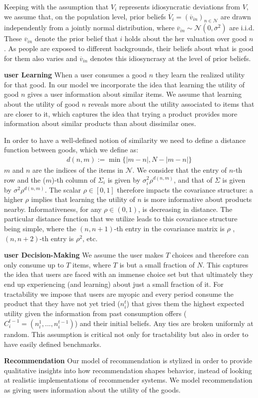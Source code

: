 \documentclass[sigconf]{acmart}
\begin{document}
Keeping with the assumption that $V_i$ represents idiosyncratic deviations from $V$, we assume that, on the population level, prior beliefs $\overline V_i=\left(\overline v_{in}\right)_{n \in \mathcal{N}}$ are drawn independently from a jointly normal distribution, where $\overline v_{in} \sim \mathcal N (0, \overline \sigma^2)$ are i.i.d. These $\overline v_{in}$ denote the prior belief that $i$ holds about the her valuation over good $n$. As people are exposed to different backgrounds, their beliefs about what is good for them also varies and $\overline v_{in}$ denotes this idiosyncrasy at the level of prior beliefs.
\par
\noindent \textbf{user Learning}
When a user consumes a good $n$ they learn the realized utility for that good. In our model we incorporate the idea that learning the utility of good $n$ gives a user information about similar items. We assume that learning about the utility of good $n$ reveals more about the utility associated to items that are closer to it, which captures the idea that trying a product provides more information about similar products than about dissimilar ones.

In order to have a well-defined notion of similarity we need to define a distance function between goods, which we define as:
\begin{align*}
d(n,m):=\min\{ \lvert m - n \rvert ,N - \lvert m - n \rvert \}
\end{align*}
 $m$ and $n$ are the indices of the items in $\mathcal{N}$. We consider that the entry of $n$-th row and the ($m$)-th column of $\Sigma_i$ is given by $\sigma_i^2 \rho^{d(n,m)}$, and that of $\Sigma$ is given by $\sigma^2 \rho^{d(n,m)}$. The scalar $\rho \in [0,1]$ therefore impacts the covariance structure: a higher $\rho$ implies that learning the utility of $n$ is more informative about products nearby. Informativeness, for any $\rho \in (0,1)$, is decreasing in distance. The particular distance function that we utilize leads to this covariance structure being simple, where the $(n,n+1)$-th entry in the covariance matrix is $\rho$ , $(n,n+2)$-th entry is $\rho^2$, etc.
\par
\textbf{user Decision-Making}
We assume the user makes $T$ choices and therefore can only consume up to $T$ items, where $T$ is but a small fraction of $N$. This captures the idea that users are faced with an immense choice set but that ultimately they end up experiencing (and learning) about just a small fraction of it. For tractability we impose that users are myopic and every period consume the product that they have not yet tried ($n_i^t$) that gives them the highest expected utility given the information from past consumption offers ($C_i^{t-1}=(n_i^1,...,n_i^{t-1})$) and their initial beliefs. Any ties are broken uniformly at random. This assumption is critical not only for tractability but also in order to have easily defined benchmarks.
\par
\noindent \textbf{Recommendation}
Our model of recommendation is stylized in order to provide qualitative insights into how recommendation shapes behavior, instead of looking at realistic implementations of recommender systems. We model recommendation as giving users information about the utility of the goods.
\end{document}
